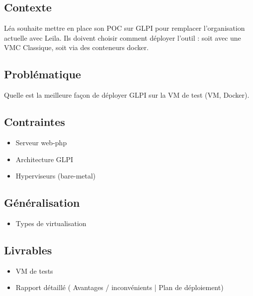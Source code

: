 \subsection*{Contexte}
{}
Léa souhaite mettre en place son POC sur GLPI pour remplacer l’organisation actuelle avec Leila. Ils doivent choisir comment déployer l’outil : soit avec une VMC Classique, soit via des conteneurs docker.

\subsection*{Problématique}
{}
Quelle est la meilleure façon de déployer GLPI sur la VM de test (VM, Docker).

\newpage

\subsection*{Contraintes}
{}
\begin{itemize}
  \item Serveur web-php
  \item Architecture GLPI
  \item Hyperviseurs (bare-metal)

\end{itemize}

\subsection*{Généralisation}
{}
\begin{itemize}
  \item Types de virtualisation

\end{itemize}

\subsection*{Livrables}
{}
\begin{itemize}
  \item VM de tests
  \item Rapport détaillé ( Avantages / inconvénients | Plan de déploiement)
\end{itemize}

